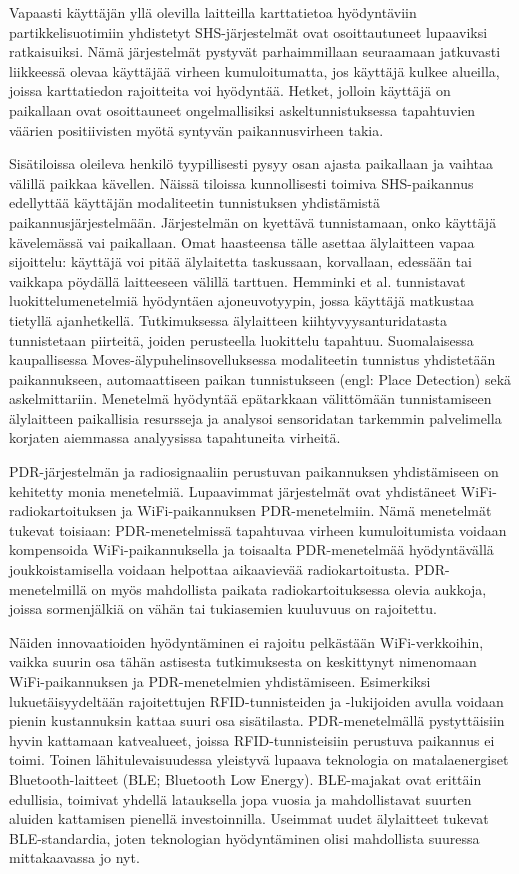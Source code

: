 Vapaasti käyttäjän yllä olevilla laitteilla karttatietoa hyödyntäviin
partikkelisuotimiin yhdistetyt SHS-järjestelmät ovat osoittautuneet lupaaviksi
ratkaisuiksi.  Nämä järjestelmät pystyvät parhaimmillaan seuraamaan jatkuvasti
liikkeessä olevaa käyttäjää virheen kumuloitumatta, jos käyttäjä kulkee
alueilla, joissa karttatiedon rajoitteita voi hyödyntää. Hetket, jolloin
käyttäjä on paikallaan ovat osoittauneet ongelmallisiksi askeltunnistuksessa
tapahtuvien väärien positiivisten myötä syntyvän paikannusvirheen takia.

Sisätiloissa oleileva henkilö tyypillisesti pysyy osan ajasta paikallaan ja
vaihtaa välillä paikkaa kävellen. Näissä tiloissa kunnollisesti toimiva
SHS-paikannus edellyttää käyttäjän modaliteetin tunnistuksen yhdistämistä
paikannusjärjestelmään.  Järjestelmän on kyettävä tunnistamaan, onko käyttäjä
kävelemässä vai paikallaan.  Omat haasteensa tälle asettaa älylaitteen vapaa
sijoittelu: käyttäjä voi pitää älylaitetta taskussaan, korvallaan, edessään tai
vaikkapa pöydällä laitteeseen välillä tarttuen. Hemminki et al.
\cite{hemminki2013} tunnistavat luokittelumenetelmiä hyödyntäen ajoneuvotyypin,
jossa käyttäjä matkustaa tietyllä ajanhetkellä. Tutkimuksessa älylaitteen
kiihtyvyysanturidatasta tunnistetaan piirteitä, joiden perusteella luokittelu
tapahtuu. Suomalaisessa kaupallisessa Moves-älypuhelinsovelluksessa
modaliteetin tunnistus yhdistetään paikannukseen, automaattiseen paikan
tunnistukseen (engl: Place Detection) sekä askelmittariin. Menetelmä hyödyntää
epätarkkaan välittömään tunnistamiseen älylaitteen paikallisia resursseja ja
analysoi sensoridatan tarkemmin palvelimella korjaten aiemmassa analyysissa
tapahtuneita virheitä.

PDR-järjestelmän ja radiosignaaliin perustuvan paikannuksen yhdistämiseen on
kehitetty monia menetelmiä. Lupaavimmat järjestelmät ovat yhdistäneet
WiFi-radiokartoituksen ja WiFi-paikannuksen PDR-menetelmiin.  Nämä menetelmät
tukevat toisiaan: PDR-menetelmissä tapahtuvaa virheen kumuloitumista voidaan
kompensoida WiFi-paikannuksella ja toisaalta PDR-menetelmää hyödyntävällä
joukkoistamisella voidaan helpottaa aikaavievää radiokartoitusta.
PDR-menetelmillä on myös mahdollista paikata radiokartoituksessa olevia
aukkoja, joissa sormenjälkiä on vähän tai tukiasemien kuuluvuus on rajoitettu.

Näiden innovaatioiden hyödyntäminen ei rajoitu pelkästään WiFi-verkkoihin,
vaikka suurin osa tähän astisesta tutkimuksesta on keskittynyt nimenomaan
WiFi-paikannuksen ja PDR-menetelmien yhdistämiseen. Esimerkiksi
lukuetäisyydeltään rajoitettujen RFID-tunnisteiden ja -lukijoiden avulla
voidaan pienin kustannuksin kattaa suuri osa sisätilasta. PDR-menetelmällä
pystyttäisiin hyvin kattamaan katvealueet, joissa RFID-tunnisteisiin perustuva
paikannus ei toimi. Toinen lähitulevaisuudessa yleistyvä lupaava teknologia on
matalaenergiset Bluetooth-laitteet (BLE; Bluetooth Low Energy).  BLE-majakat
ovat erittäin edullisia, toimivat yhdellä latauksella jopa vuosia ja
mahdollistavat suurten aluiden kattamisen pienellä investoinnilla.  Useimmat
uudet älylaitteet tukevat BLE-standardia, joten teknologian hyödyntäminen olisi
mahdollista suuressa mittakaavassa jo nyt.

